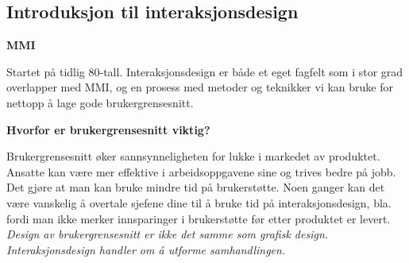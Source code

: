 \documentclass{article}
\begin{document}
\begin{flushleft}
\section{\textbf{Introduksjon til interaksjonsdesign}}
\textbf{MMI}\par
Startet på tidlig 80-tall. Interaksjonsdesign er både et eget fagfelt som i stor grad overlapper med MMI, og en prosess
med metoder og teknikker vi kan bruke for nettopp å lage gode brukergrensesnitt. \par
\bigskip
\textbf{Hvorfor er brukergrensesnitt viktig?} \par
Brukergrensesnitt øker sannsynneligheten for lukke i markedet av produktet.
Ansatte kan være mer effektive i arbeidsoppgavene sine og trives bedre på jobb. 
Det gjøre at man kan bruke mindre tid på brukerstøtte. 
Noen ganger kan det være vanskelig å overtale sjefene dine til å bruke tid på interaksjonsdesign, bla. fordi man ikke merker innsparinger i brukerstøtte før etter produktet er levert. 
\emph{Design av brukergrensesnitt er ikke det samme som grafisk design. Interaksjonsdesign handler om å utforme samhandlingen.}\par
\bigskip

\end{flushleft}
\end{document}
